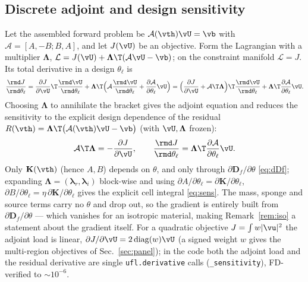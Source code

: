 \subsection{Discrete adjoint and design sensitivity}
Let the assembled forward problem be $\mathcal A(\vth)\vU=\vb$ with
$\mathcal A=[A,-B;B,A]$, and let $J(\vU)$ be an objective. Form the Lagrangian with
a multiplier $\bm\Lambda$,
$\mathcal L=J(\vU)+\bm\Lambda\T(\mathcal A\vU-\vb)$; on the constraint manifold
$\mathcal L=J$. Its total derivative in a design $\theta_\ell$ is
\begin{equation}
  \frac{\rmd J}{\rmd\theta_\ell}
  =\frac{\partial J}{\partial\vU}\T\frac{\rmd\vU}{\rmd\theta_\ell}
  +\bm\Lambda\T\Bigl(\mathcal A\frac{\rmd\vU}{\rmd\theta_\ell}
  +\frac{\partial\mathcal A}{\partial\theta_\ell}\vU\Bigr)
  =\Bigl(\frac{\partial J}{\partial\vU}+\mathcal A\T\bm\Lambda\Bigr)\T
  \frac{\rmd\vU}{\rmd\theta_\ell}
  +\bm\Lambda\T\frac{\partial\mathcal A}{\partial\theta_\ell}\vU .
\end{equation}
Choosing $\bm\Lambda$ to annihilate the bracket gives the adjoint equation and
reduces the sensitivity to the explicit design dependence of the residual
$R(\vth)=\bm\Lambda\T\big(\mathcal A(\vth)\vU-\vb\big)$ (with $\vU,\bm\Lambda$ frozen):
\begin{equation}
  \mathcal A\T\bm\Lambda=-\frac{\partial J}{\partial\vU},\qquad
  \frac{\rmd J}{\rmd\theta_\ell}=\bm\Lambda\T
  \frac{\partial\mathcal A}{\partial\theta_\ell}\vU .
\end{equation}
Only $\mathbf K(\vth)$ (hence $A,B$) depends on $\theta$, and only through
$\partial\mathbf D_f/\partial\theta$ \eqref{eq:dDf}; expanding $\bm\Lambda=(\bm
\lambda_r,\bm\lambda_i)$ block-wise and using $\partial A/\partial\theta_\ell=
\partial\mathbf K/\partial\theta_\ell$, $\partial B/\partial\theta_\ell=\eta\,
\partial\mathbf K/\partial\theta_\ell$ gives the explicit cell integral
\eqref{eq:sens}. The mass, sponge and source terms carry no $\theta$ and drop out,
so the gradient is entirely built from $\partial\mathbf D_f/\partial\theta$ ---
which vanishes for an isotropic material, making Remark~\ref{rem:iso} a statement
about the gradient itself. For a quadratic objective $J=\int w|\vu|^2$ the adjoint
load is linear, $\partial J/\partial\vU=2\,\mathrm{diag}(w)\vU$ (a signed weight $w$ gives the
multi-region objectives of Sec.~\ref{sec:panel}); in the code both the
adjoint load and the residual derivative are single \texttt{ufl.derivative} calls
(\texttt{\_sensitivity}), FD-verified to $\sim\!10^{-6}$.

